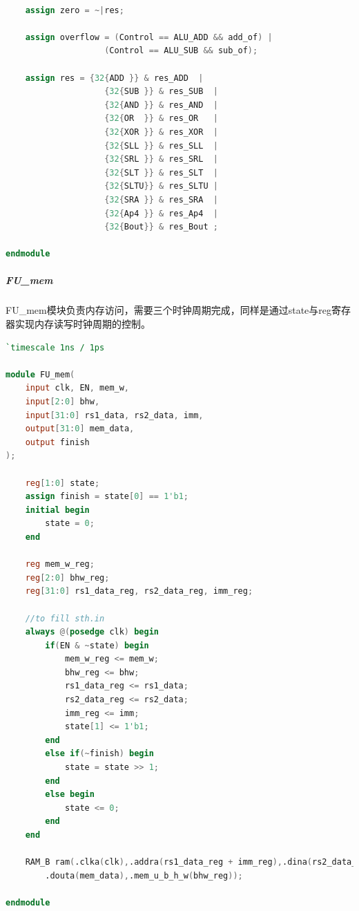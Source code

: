 \begin{lstlisting}[language = {verilog}]
	
	assign zero = ~|res;
	
	assign overflow = (Control == ALU_ADD && add_of) | 
					(Control == ALU_SUB && sub_of);
	
	assign res = {32{ADD }} & res_ADD  |
					{32{SUB }} & res_SUB  |
					{32{AND }} & res_AND  |
					{32{OR  }} & res_OR   |
					{32{XOR }} & res_XOR  |
					{32{SLL }} & res_SLL  |
					{32{SRL }} & res_SRL  |
					{32{SLT }} & res_SLT  |
					{32{SLTU}} & res_SLTU |
					{32{SRA }} & res_SRA  |
					{32{Ap4 }} & res_Ap4  |
					{32{Bout}} & res_Bout ;

endmodule
\end{lstlisting}

\subparagraph{FU\_mem} FU\_mem模块负责内存访问，需要三个时钟周期完成，同样是通过state与reg寄存器实现内存读写时钟周期的控制。
\begin{lstlisting}[language = {verilog}]
`timescale 1ns / 1ps

module FU_mem(
	input clk, EN, mem_w,
	input[2:0] bhw,
	input[31:0] rs1_data, rs2_data, imm,
	output[31:0] mem_data,
	output finish
);

	reg[1:0] state;
	assign finish = state[0] == 1'b1;
	initial begin
		state = 0;
	end

	reg mem_w_reg;
	reg[2:0] bhw_reg;
	reg[31:0] rs1_data_reg, rs2_data_reg, imm_reg;

	//to fill sth.in
	always @(posedge clk) begin
		if(EN & ~state) begin
			mem_w_reg <= mem_w;
			bhw_reg <= bhw;
			rs1_data_reg <= rs1_data;
			rs2_data_reg <= rs2_data;
			imm_reg <= imm;
			state[1] <= 1'b1;
		end
		else if(~finish) begin
			state = state >> 1;
		end
		else begin
			state <= 0;
		end
	end

	RAM_B ram(.clka(clk),.addra(rs1_data_reg + imm_reg),.dina(rs2_data_reg),.wea(mem_w_reg),
		.douta(mem_data),.mem_u_b_h_w(bhw_reg));

endmodule
\end{lstlisting}